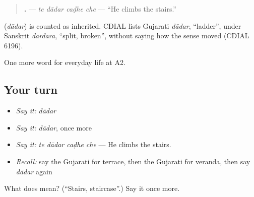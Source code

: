 \begin{quote}
\textbf{   .} — \emph{te dādar caḍhe che} — \textquotedblleft{}He climbs the stairs.\textquotedblright{}
\end{quote}

\begin{cousinweb}
\textbf{} (\emph{dādar}) is counted as inherited. CDIAL lists Gujarati \emph{dādar}, \textquotedblleft{}ladder\textquotedblright{}, under Sanskrit \emph{dardara}, \textquotedblleft{}split, broken\textquotedblright{}, without saying how the sense moved (CDIAL 6196).
\end{cousinweb}

\begin{grammarlens}[title={What you've built}]
One more word for everyday life at A2.
\end{grammarlens}

\subsection*{Your turn}
\begin{itemize}
\raggedright
  \item \emph{Say it:} \emph{dādar}
  \item \emph{Say it:} \emph{dādar}, once more
  \item \emph{Say it:} \emph{te dādar caḍhe che} — He climbs the stairs.
  \item \emph{Recall:} say the Gujarati for terrace, then the Gujarati for veranda, then say \emph{dādar} again
\end{itemize}

\begin{tcolorbox}[breakable,colback=teal!4,colframe=teal!35!black,title={Before you move on}]
What does  mean? (\textquotedblleft{}Stairs, staircase\textquotedblright{}.) Say it once more.
\end{tcolorbox}
